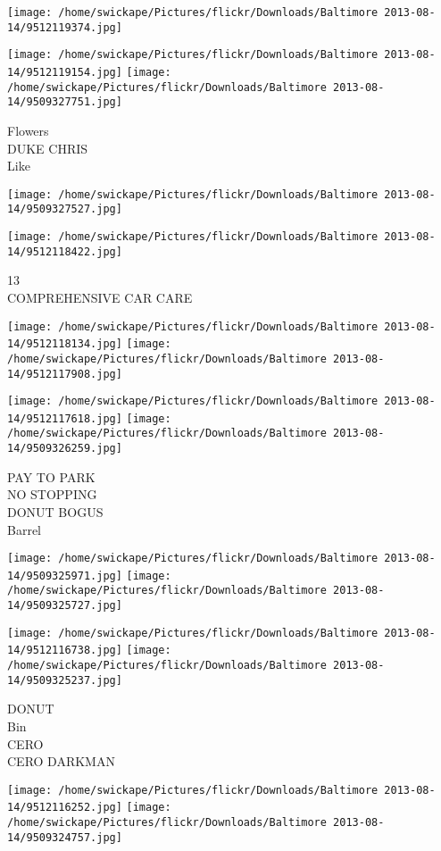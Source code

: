\documentclass[10pt,letterpaper]{article}
\begin{document}
\texttt{[image: /home/swickape/Pictures/flickr/Downloads/Baltimore 2013-08-14/9512119374.jpg]}

\vspace{0.25in}
\texttt{[image: /home/swickape/Pictures/flickr/Downloads/Baltimore 2013-08-14/9512119154.jpg]}
\texttt{[image: /home/swickape/Pictures/flickr/Downloads/Baltimore 2013-08-14/9509327751.jpg]}

Flowers\\
DUKE CHRIS\\
Like
\pagebreak

\texttt{[image: /home/swickape/Pictures/flickr/Downloads/Baltimore 2013-08-14/9509327527.jpg]}

\vspace{0.25in}
\texttt{[image: /home/swickape/Pictures/flickr/Downloads/Baltimore 2013-08-14/9512118422.jpg]}

13\\
COMPREHENSIVE CAR CARE
\pagebreak

\texttt{[image: /home/swickape/Pictures/flickr/Downloads/Baltimore 2013-08-14/9512118134.jpg]}
\texttt{[image: /home/swickape/Pictures/flickr/Downloads/Baltimore 2013-08-14/9512117908.jpg]}

\texttt{[image: /home/swickape/Pictures/flickr/Downloads/Baltimore 2013-08-14/9512117618.jpg]}
\texttt{[image: /home/swickape/Pictures/flickr/Downloads/Baltimore 2013-08-14/9509326259.jpg]}

PAY TO PARK\\
NO STOPPING\\
DONUT BOGUS\\
Barrel
\pagebreak

\texttt{[image: /home/swickape/Pictures/flickr/Downloads/Baltimore 2013-08-14/9509325971.jpg]}
\texttt{[image: /home/swickape/Pictures/flickr/Downloads/Baltimore 2013-08-14/9509325727.jpg]}

\texttt{[image: /home/swickape/Pictures/flickr/Downloads/Baltimore 2013-08-14/9512116738.jpg]}
\texttt{[image: /home/swickape/Pictures/flickr/Downloads/Baltimore 2013-08-14/9509325237.jpg]}

DONUT\\
Bin\\
CERO\\
CERO DARKMAN
\pagebreak

\texttt{[image: /home/swickape/Pictures/flickr/Downloads/Baltimore 2013-08-14/9512116252.jpg]}
\texttt{[image: /home/swickape/Pictures/flickr/Downloads/Baltimore 2013-08-14/9509324757.jpg]}
\end{document}
